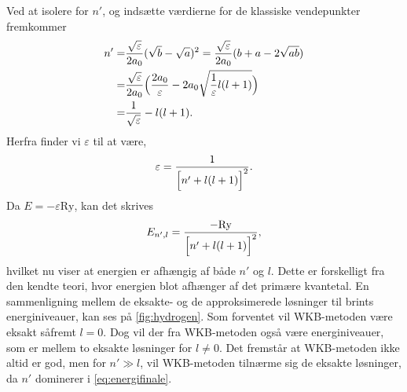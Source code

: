 %
Ved at isolere for $n'$, og indsætte værdierne for de klassiske vendepunkter fremkommer
\begin{align}
  n' = & \frac{\sqrt{\varepsilon}}{2a_0}(\sqrt{b}-\sqrt{a})^2 = \frac{\sqrt{\varepsilon}}{2a_0}(b+a-2\sqrt{ab})\\
     = & \frac{\sqrt{\varepsilon}}{2a_0}\Bigl(\frac{2a_0}{\varepsilon}-2a_0\sqrt{\frac{1}{\varepsilon}l(l+1)}\Bigr)\\
     = & \frac{1}{\sqrt{\varepsilon}} -l(l+1).
\end{align}
Herfra finder vi $\varepsilon$ til at være,
\begin{equation}
    \varepsilon = \frac{1}{\Bigl[n'+l(l+1)  \Bigr]^2}.
\end{equation}
Da $E = -\varepsilon \mathrm{Ry}$, kan det skrives
\begin{equation}
    E_{n',l} = \frac{-\mathrm{Ry}}{\Bigl[n'+l(l+1)  \Bigr]^2},
    \label{eq:energifinale}
\end{equation}
hvilket nu viser at energien er afhængig af både $n'$ og $l$. Dette er forskelligt fra den kendte teori, hvor energien blot afhænger af det primære kvantetal. En sammenligning mellem de eksakte- og de approksimerede løsninger til brints energiniveauer, kan ses på \cref{fig:hydrogen}. Som forventet vil WKB-metoden være eksakt såfremt $l=0$. Dog vil der fra WKB-metoden også være energiniveauer, som er mellem to eksakte løsninger for $l\neq 0$. Det fremstår at WKB-metoden ikke altid er god, men for $n'\gg l$, vil WKB-metoden tilnærme sig de eksakte løsninger, da $n'$ dominerer i \cref{eq:energifinale}.

